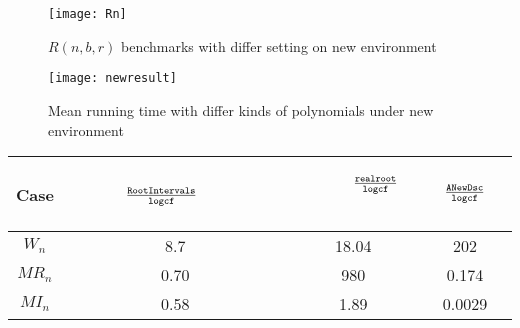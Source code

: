 %
%


%


\begin{figure}
	\begin{centering}
		\texttt{[image: Rn]}
		\caption{ $R(n,b,r)$ benchmarks  with differ setting on new environment\label{fig:2}}
	\end{centering}
\end{figure}



\begin{figure}
	\begin{centering}
		\texttt{[image: newresult]}
		\caption{ Mean running time with differ kinds of polynomials under new environment\label{fig:newresult}}
	\end{centering}
\end{figure}

\begin{table}
	\centering
	\label{tab:other}
	\begin{tabular}{|| c| c| c| c||}
		\hline
		
		\hline
		\scriptsize{Case}  &\ \  \ \ \ \ \scriptsize{$\frac{{\tt RootIntervals} }{{\tt logcf}}$}\ \  \ \ \ \ \  \ \   & \ \ \ \ \  \scriptsize{$\frac{{\tt realroot}}{{\tt logcf}}$} \ \ \ \ \  &\ \ \ \  \scriptsize{ $\frac{{\tt ANewDsc}}{{\tt logcf}}$ }  \ \ \ \   \\
		\hline
		$W_n$ & 8.7 & 18.04 &  202 \\
		\hline
		$MR_n$ & 0.70 & 980 & 0.174\\
		\hline
		$MI_n$ & 0.58 & 1.89&  0.0029  \\
		\hline
		
		\hline
	\end{tabular}%
\end{table}




